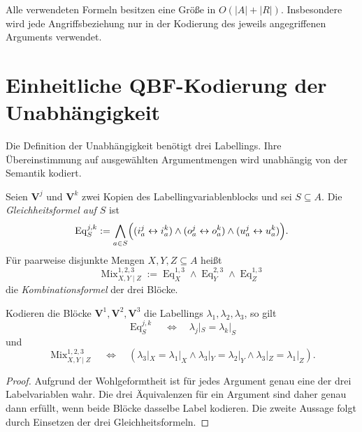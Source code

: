 Alle verwendeten Formeln besitzen eine Größe in
\(O(|A|+|R|)\). Insbesondere wird jede Angriffsbeziehung nur in der
Kodierung des jeweils angegriffenen Arguments verwendet.

\section{Einheitliche QBF-Kodierung der Unabhängigkeit}
\label{sec:uniform-independence-qbf}

Die Definition der Unabhängigkeit benötigt drei Labellings. Ihre
Übereinstimmung auf ausgewählten Argumentmengen wird unabhängig von der
Semantik kodiert.

\begin{Definition}
    \label{def:equality-and-mix-formulas}
    Seien \(\mathbf V^j\) und \(\mathbf V^k\) zwei Kopien des
    Labellingvariablenblocks und sei \(S\subseteq A\). Die
    \emph{Gleichheitsformel auf \(S\)} ist
    \[
        \operatorname{Eq}^{j,k}_S
        :=
        \bigwedge_{a\in S}
        \Bigl(
            (i_a^j\leftrightarrow i_a^k)
            \land(o_a^j\leftrightarrow o_a^k)
            \land(u_a^j\leftrightarrow u_a^k)
        \Bigr).
    \]
    Für paarweise disjunkte Mengen \(X,Y,Z\subseteq A\) heißt
    \[
        \operatorname{Mix}^{1,2,3}_{X,Y\mid Z}
        :=
        \operatorname{Eq}^{1,3}_X
        \land
        \operatorname{Eq}^{2,3}_Y
        \land
        \operatorname{Eq}^{1,3}_Z
    \]
    die \emph{Kombinationsformel} der drei Blöcke.
\end{Definition}

\begin{Lemma}
    \label{lem:equality-and-mix-correct}
    Kodieren die Blöcke \(\mathbf V^1,\mathbf V^2,\mathbf V^3\) die
    Labellings \(\lambda_1,\lambda_2,\lambda_3\), so gilt
    \[
        \operatorname{Eq}^{j,k}_S
        \quad\Longleftrightarrow\quad
        \lambda_j|_S=\lambda_k|_S
    \]
    und
    \[
        \operatorname{Mix}^{1,2,3}_{X,Y\mid Z}
        \quad\Longleftrightarrow\quad
        \left(
        \lambda_3|_X=\lambda_1|_X
        \land
        \lambda_3|_Y=\lambda_2|_Y
        \land
        \lambda_3|_Z=\lambda_1|_Z
        \right).
    \]
\end{Lemma}

\begin{proof}
    Aufgrund der Wohlgeformtheit ist für jedes Argument genau eine der drei
    Labelvariablen wahr. Die drei Äquivalenzen für ein Argument sind daher
    genau dann erfüllt, wenn beide Blöcke dasselbe Label kodieren. Die zweite
    Aussage folgt durch Einsetzen der drei Gleichheitsformeln.
\end{proof}

